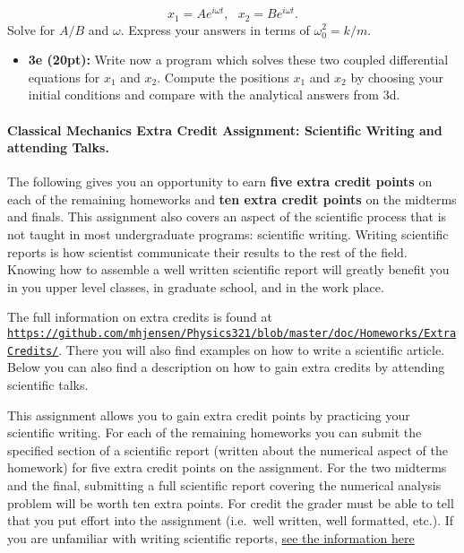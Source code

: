 \documentclass[%
oneside,                 %
final,                   %
10pt]{article}
\begin{document}
\noindent
\[
x_1=Ae^{i\omega t},~~~x_2=Be^{i\omega t}.
\]
Solve for $A/B$ and $\omega$. Express your answers in terms of $\omega_0^2=k/m$.

\begin{itemize}
\item \textbf{3e (20pt):} Write now a program which solves these two coupled differential equations for $x_1$ and $x_2$. Compute the positions $x_1$ and $x_2$ by choosing your initial conditions and compare with the analytical answers from 3d.   
\end{itemize}

\noindent
\paragraph{Classical Mechanics Extra Credit Assignment: Scientific Writing and attending Talks.}
The following gives you an opportunity to earn \textbf{five extra credit
points} on each of the remaining homeworks and \textbf{ten extra credit points}
on the midterms and finals.  This assignment also covers an aspect of
the scientific process that is not taught in most undergraduate
programs: scientific writing.  Writing scientific reports is how
scientist communicate their results to the rest of the field.  Knowing
how to assemble a well written scientific report will greatly benefit
you in you upper level classes, in graduate school, and in the work
place.

The full information on extra credits is found at \href{{https://github.com/mhjensen/Physics321/blob/master/doc/Homeworks/ExtraCredits/}}{\nolinkurl{https://github.com/mhjensen/Physics321/blob/master/doc/Homeworks/ExtraCredits/}}. There you will also find examples on how to write a scientific article. 
Below you can also find a description on how to gain extra credits by attending scientific talks.


This assignment allows you to gain extra credit points by practicing
your scientific writing.  For each of the remaining homeworks you can
submit the specified section of a scientific report (written about the
numerical aspect of the homework) for five extra credit points on the
assignment.  For the two midterms and the final, submitting a full
scientific report covering the numerical analysis problem will be
worth ten extra points.  For credit the grader must be able to tell
that you put effort into the assignment (i.e.~well written, well
formatted, etc.).  If you are unfamiliar with writing scientific
reports, \href{{https://github.com/mhjensen/Physics321/blob/master/doc/Homeworks/ExtraCredits/IntroductionScientificWriting.md}}{see the information here}
\end{document}
